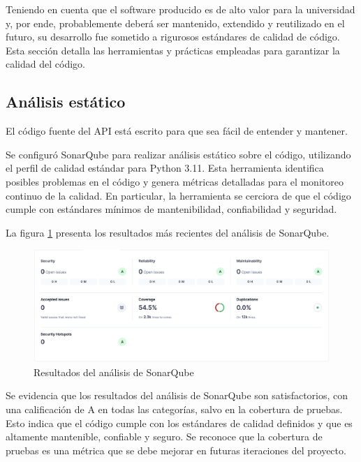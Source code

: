 Teniendo en cuenta que el software producido es de alto valor para la universidad y, por ende, probablemente deberá ser mantenido, extendido y reutilizado en el futuro, su desarrollo fue sometido a rigurosos estándares de calidad de código. Esta sección detalla las herramientas y prácticas empleadas para garantizar la calidad del código.

\subsection{Análisis estático}

El código fuente del \gls{API} está escrito para que sea fácil de entender y mantener.

Se configuró \gls{SonarQube} para realizar análisis estático sobre el código, utilizando el \gls{perfil de calidad} estándar para \gls{Python} 3.11. Esta herramienta identifica posibles problemas en el código y genera métricas detalladas para el monitoreo continuo de la calidad. En particular, la herramienta se cerciora de que el código cumple con estándares mínimos de mantenibilidad, confiabilidad y seguridad.

La figura \ref{fig:sonarqube} presenta los resultados más recientes del análisis de \gls{SonarQube}.

\begin{figure}[H]
	\centering
	\includegraphics[width=\textwidth]{assets/sonarqube.png}
	\caption{Resultados del análisis de \gls{SonarQube}}
	\label{fig:sonarqube}
\end{figure}

Se evidencia que los resultados del análisis de \gls{SonarQube} son satisfactorios, con una calificación de A en todas las categorías, salvo en la cobertura de pruebas. Esto indica que el código cumple con los estándares de calidad definidos y que es altamente mantenible, confiable y seguro. Se reconoce que la cobertura de pruebas es una métrica que se debe mejorar en futuras iteraciones del proyecto.

